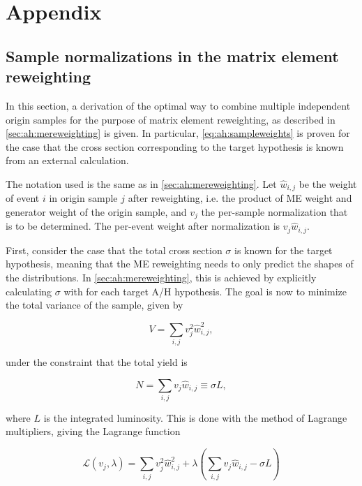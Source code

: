 \chapter{Appendix}

\section{Sample normalizations in the matrix element reweighting}
\label{app:mereweighting}
In this section, a derivation of the optimal way to combine multiple independent origin samples for the purpose of matrix element reweighting, as described in \cref{sec:ah:mereweighting} is given. In particular, \cref{eq:ah:sampleweights} is proven for the case that the cross section corresponding to the target hypothesis is known from an external calculation.

The notation used is the same as in \cref{sec:ah:mereweighting}. Let $\hat{w}_{i,j}$ be the weight of event $i$ in origin sample $j$ after reweighting, i.e. the product of ME weight and generator weight of the origin sample, and $v_j$ the per-sample normalization that is to be determined. The per-event weight after normalization is $v_j \hat{w}_{i,j}$. 

First, consider the case that the total cross section $\sigma$ is known for the target hypothesis, meaning that the ME reweighting needs to only predict the shapes of the distributions. In \cref{sec:ah:mereweighting}, this is achieved by explicitly calculating $\sigma$ with \amcatnlo for each target A/H hypothesis. The goal is now to minimize the total variance of the sample, given by

\begin{equation}
    V = \sum_{i,j} v_j^2 \hat{w}_{i,j}^2 ,
\end{equation}

\noindent under the constraint that the total yield is

\begin{equation}
\label{eq:app:mecontstraint}
    N = \sum_{i,j} v_j \hat{w}_{i,j} \equiv \sigma L ,
\end{equation}

\noindent where $L$ is the integrated luminosity. This is done with the method of Lagrange multipliers, giving the Lagrange function

\begin{equation}
    \mathcal{L} (v_j, \lambda) = \sum_{i,j} v_j^2 \hat{w}_{i,j}^2 + \lambda \left( \sum_{i,j} v_j \hat{w}_{i,j} - \sigma L \right)
\end{equation}

